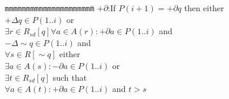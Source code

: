 
\begin{tabbing}
{\tt mmm}\={\tt mmmmmm}\={\tt mmmm}\={\tt mmmm}\={\tt mmmm}\=\kill
\>$+\partial$:\>If $P(i + 1) = + \partial q$ then either \\
\>\>$+\Delta q \in P(1..i)$ or \\
\>\>\>$\exists r \in R_{sd}[q] \forall a \in A(r): +\partial a \in P(1..i)$ and \\
\>\>\>$- \Delta \sim q \in P(1..i)$ and \\
\>\>\>$\forall s \in R[\sim q]$ either \\
\>\>\>\>$\exists a\in A(s): -\partial a\in P(1..i)$ or \\
\>\>\>\>$\exists t\in R_{sd}[q]$ such that \\
\>\>\>\>\> $\forall a\in A(t): +\partial a\in P(1..i)$ and $t>s$ 
\end{tabbing}

